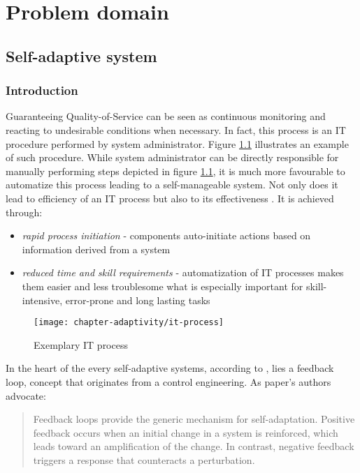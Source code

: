 \chapter{Problem domain}

\section{Self-adaptive system}

\subsection{Introduction}
Guaranteeing Quality-of-Service can be seen as continuous monitoring and reacting to undesirable conditions when necessary. In fact, this process is an IT procedure performed by system administrator. Figure \ref{fig:it-process} illustrates an example of such procedure. While system administrator can be directly responsible for manually performing steps depicted in figure \ref{fig:it-process}, it is much more favourable to automatize this process leading to a self-manageable system. Not only does it lead to efficiency of an IT process but also to its effectiveness \cite{IBM06}. It is achieved through:
\begin{itemize}
  \item \emph{rapid process initiation} - components auto-initiate actions based on information derived from a system
  \item \emph{reduced time and skill requirements} - automatization of IT processes makes them easier and less troublesome what is especially important for skill-intensive, error-prone and long lasting tasks
\end{itemize}

\begin{figure}[!ht]
  \begin{center}
    \texttt{[image: chapter-adaptivity/it-process]}
  \end{center}
  \caption{Exemplary IT process}
  \label{fig:it-process}
\end{figure}


In the heart of the every self-adaptive systems, according to \cite{brun2009engineering}, lies a feedback loop, concept that originates from a control engineering. As paper's authors advocate:
\begin{quote}
Feedback loops provide the generic mechanism for self-adaptation. Positive feedback occurs when an initial change in a system is reinforced, which leads toward an amplification of the change. In contrast, negative feedback triggers a response that counteracts a perturbation. 
\end{quote}


